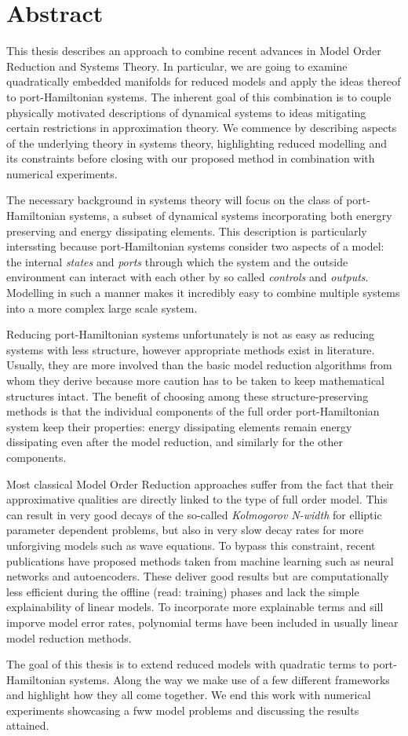 \chapter*{Abstract}

This thesis describes an approach to combine recent advances in Model Order Reduction and Systems Theory.
In particular, we are going to examine quadratically embedded manifolds for reduced models and apply the ideas thereof to port-Hamiltonian systems.
The inherent goal of this combination is to couple physically motivated descriptions of dynamical systems to ideas mitigating certain restrictions in approximation theory.
We commence by describing aspects of the underlying theory in systems theory, highlighting reduced modelling and its constraints before closing with our proposed method in combination with numerical experiments.

The necessary background in systems theory will focus on the class of port-Hamiltonian systems, a subset of dynamical systems incorporating both energry preserving and energy dissipating elements.
This description is particularly interssting because port-Hamiltonian systems consider two aspects of a model: the internal \emph{states} and \emph{ports} through which the system and the outside environment can interact with each other by so called \emph{controls} and \emph{outputs}.
Modelling in such a manner makes it incredibly easy to combine multiple systems into a more complex large scale system.

Reducing port-Hamiltonian systems unfortunately is not as easy as reducing systems with less structure, however appropriate methods exist in literature.
Usually, they are more involved than the basic model reduction algorithms from whom they derive because more caution has to be taken to keep mathematical structures intact.
The benefit of choosing among these structure-preserving methods is that the individual components of the full order port-Hamiltonian system keep their properties: energy dissipating elements remain energy dissipating even after the model reduction, and similarly for the other components.

Most classical Model Order Reduction approaches suffer from the fact that their approximative qualities are directly linked to the type of full order model.
This can result in very good decays of the so-called \emph{Kolmogorov N-width} for elliptic parameter dependent problems, but also in very slow decay rates for more unforgiving models such as wave equations.
To bypass this constraint, recent publications have proposed methods taken from machine learning such as neural networks and autoencoders.
These deliver good results but are computationally less efficient during the offline (read: training) phases and lack the simple explainability of linear models.
To incorporate more explainable terms and sill imporve model error rates, polynomial terms have been included in usually linear model reduction methods.

The goal of this thesis is to extend reduced models with quadratic terms to port-Hamiltonian systems.
Along the way we make use of a few different frameworks and highlight how they all come together.
We end this work with numerical experiments showcasing a fww model problems and discussing the results attained.
